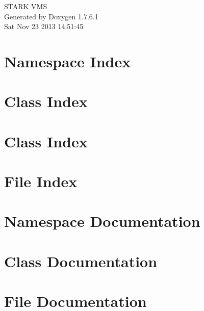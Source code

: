 \documentclass[a4paper]{book}
\begin{document}
\hypersetup{pageanchor=false,citecolor=blue}
\begin{titlepage}
\vspace*{7cm}
\begin{center}
{\Large \-S\-T\-A\-R\-K \-V\-M\-S }\\
\vspace*{1cm}
{\large \-Generated by Doxygen 1.7.6.1}\\
\vspace*{0.5cm}
{\small Sat Nov 23 2013 14:51:45}\\
\end{center}
\end{titlepage}
\clearemptydoublepage
{}
\tableofcontents
\clearemptydoublepage
{}
\hypersetup{pageanchor=true,citecolor=blue}
\chapter{\-Namespace \-Index}

\chapter{\-Class \-Index}

\chapter{\-Class \-Index}

\chapter{\-File \-Index}

\chapter{\-Namespace \-Documentation}




\chapter{\-Class \-Documentation}










\chapter{\-File \-Documentation}










\printindex
\end{document}
